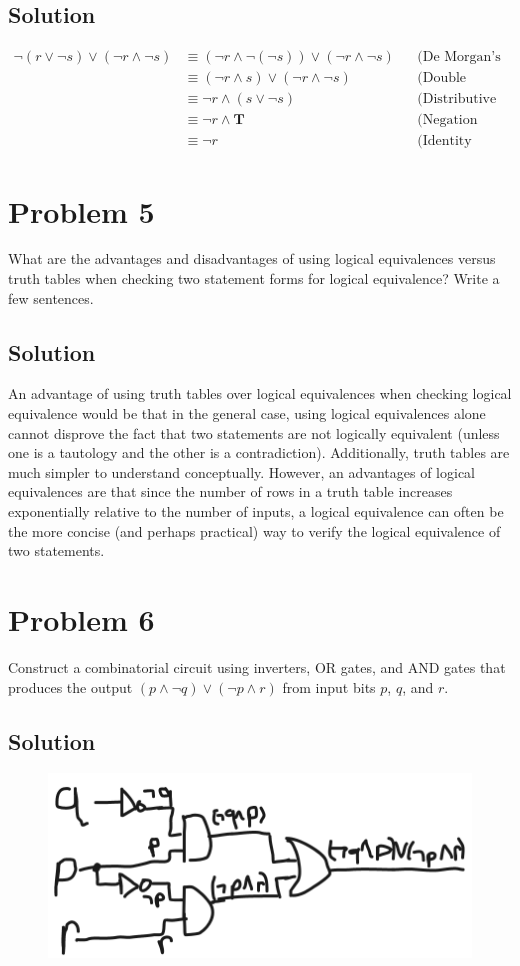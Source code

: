 \documentclass[table]{article}
\begin{document}
\subsection{Solution}
\begin{align*}
\neg (r \lor \neg s) \lor (\neg r \land \neg s)
&\equiv (\neg r \land \neg (\neg s)) \lor (\neg r \land \neg s) && \text{(De Morgan's Law)}\\
&\equiv (\neg r \land s) \lor (\neg r \land \neg s) && \text{(Double Negation Law)}\\
&\equiv \neg r \land (s \lor \neg s) && \text{(Distributive Law)}\\
&\equiv \neg r \land \textbf{T} && \text{(Negation Law)}\\
&\equiv \neg r && \text{(Identity Law)}
\end{align*}
\section{Problem 5}
What are the advantages and disadvantages of using logical equivalences versus truth tables when checking two statement forms for logical equivalence? Write a few sentences.
\subsection{Solution}
An advantage of using truth tables over logical equivalences when checking logical equivalence would be that in the general case, using logical equivalences alone cannot disprove the fact that two statements are not logically equivalent (unless one is a tautology and the other is a contradiction). Additionally, truth tables are much simpler to understand conceptually. However, an advantages of logical equivalences are that since the number of rows in a truth table increases exponentially relative to the number of inputs, a logical equivalence can often be the more concise (and perhaps practical) way to verify the logical equivalence of two statements.
\pagebreak
\section{Problem 6}
Construct a combinatorial circuit using inverters, OR gates, and AND gates that produces the output $(p \land \neg q) \lor (\neg p \land r)$ from input bits $p$, $q$, and $r$.
\subsection{Solution}
\begin{figure}[h!]
	\includegraphics[scale=.545]{images/Prob6Solution.png}
\end{figure}
\end{document}
